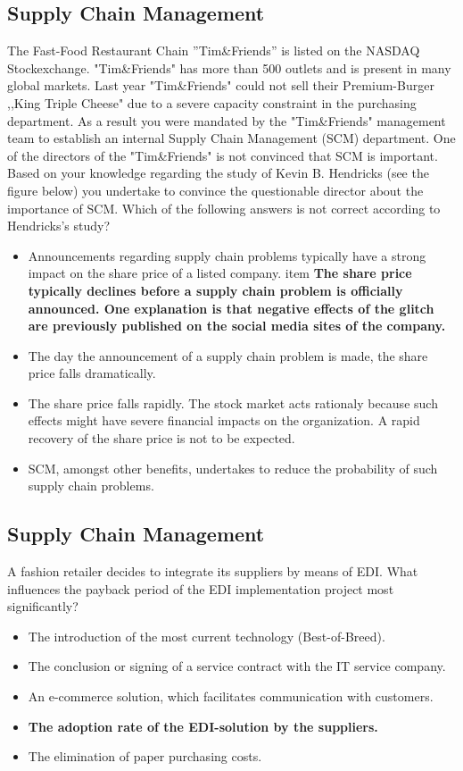 \subsection{Supply Chain Management}
The Fast-Food Restaurant Chain ''Tim\&Friends'' is listed on the NASDAQ Stockexchange. "Tim\&Friends" has more than 500 outlets and is present in many global markets. Last year "Tim\&Friends" could not sell their Premium-Burger ,,King Triple Cheese" due to a severe capacity constraint in the purchasing department. As a result you were mandated by
the "Tim\&Friends" management team to establish an internal Supply Chain Management (SCM) department.
One of the directors of the "Tim\&Friends" is not convinced that SCM is important. Based on your knowledge regarding the study of Kevin B. Hendricks (see the figure below) you undertake to convince the questionable director about the importance of SCM. Which of the following answers is not correct according to Hendricks's study?
\begin{itemize}
\item  Announcements regarding supply chain problems typically have a strong impact on the share price of a listed company.
item \textbf{The share price typically declines before a supply chain problem is officially announced. One explanation is that negative effects of the glitch are previously published on the social media sites of the company.}
\item The day the announcement of a supply chain problem is made, the share price falls dramatically.
\item The share price falls rapidly. The stock market acts rationaly because such effects might have severe financial impacts on the organization. A rapid recovery of the share price is not to be expected.
\item SCM, amongst other benefits, undertakes to reduce the probability of such supply chain
problems.
\end{itemize}
\subsection{Supply Chain Management}
A fashion retailer decides to integrate its suppliers by means of EDI. What influences the payback period of the EDI implementation project most significantly?
\begin{itemize}
	\item The introduction of the most current technology (Best-of-Breed).
	\item The conclusion or signing of a service contract with the IT service company.
	\item An e-commerce solution, which facilitates communication with customers.
\item \textbf{The adoption rate of the EDI-solution by the suppliers.} 
\item The elimination of paper purchasing costs.
\end{itemize}
